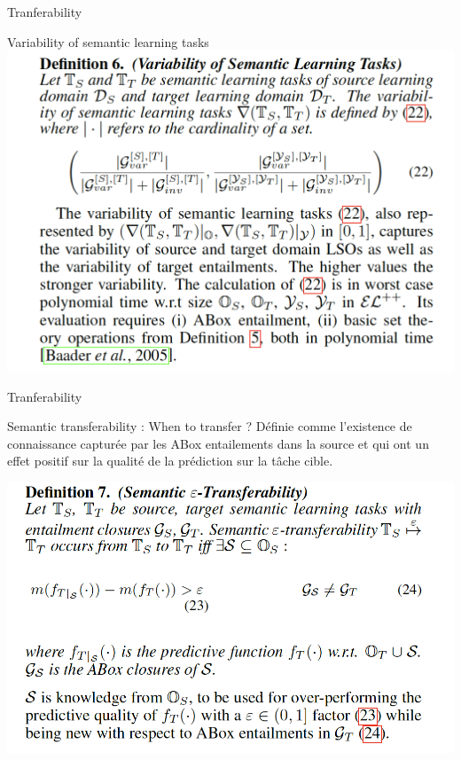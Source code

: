 \documentclass{beamer}
\begin{document}
\begin{frame}{Tranferability}
\begin{block}{Variability of semantic learning tasks}
 \centering
    \includegraphics[scale=0.4]{Figures/VSLT.png}
\end{block}
\end{frame}


\begin{frame}{Tranferability}
\begin{block}{Semantic transferability : When to transfer ?}
\footnotesize
Définie comme l'existence de connaissance capturée par les ABox entailements dans la source et qui ont un effet positif sur la qualité de la prédiction sur la tâche cible.

 \centering
    \includegraphics[scale=0.4]{Figures/epsilon.png}
\end{block}
\end{frame}
\end{document}
